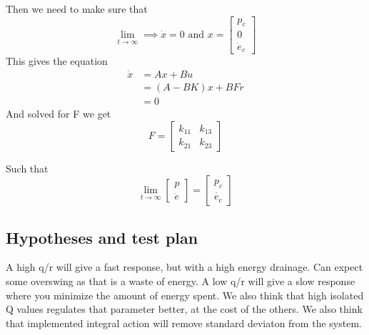 Then we need to make sure that 
\begin{equation*}
    \lim_{t \to \infty} \implies \dot{x} = 0 \text{ and } x = \left[
    \begin{array}{c}
        p_c \\
        0 \\
        \dot{e}_c
    \end{array}
    \right]
\end{equation*}
This gives the equation
\begin{align*}
    \dot{x} &= Ax + Bu \\
    &= (A - BK)x + BFr \\
    &= 0
\end{align*}
And solved for F we get
\begin{equation*}
    F =
    \begin{bmatrix}
        k_{11} & k_{13} \\
        k_{21} & k_{23}
    \end{bmatrix}
\end{equation*}

Such that
\begin{equation*}
    \lim_{t \to \infty} 
    \begin{bmatrix}
        p \\
        \dot{e}
    \end{bmatrix}
    =
    \begin{bmatrix}
        p_c \\
        \dot{e_c}
    \end{bmatrix}
\end{equation*}

\subsection{Hypotheses and test plan}
A high q/r will give a fast response, but with a high energy drainage. Can expect some overswing as that is a waste of energy. A low q/r will give a slow response where you minimize the amount of energy spent. We also think that high isolated Q values regulates that parameter better, at the cost of the others. We also think that implemented integral action will remove standard deviaton from the system.

